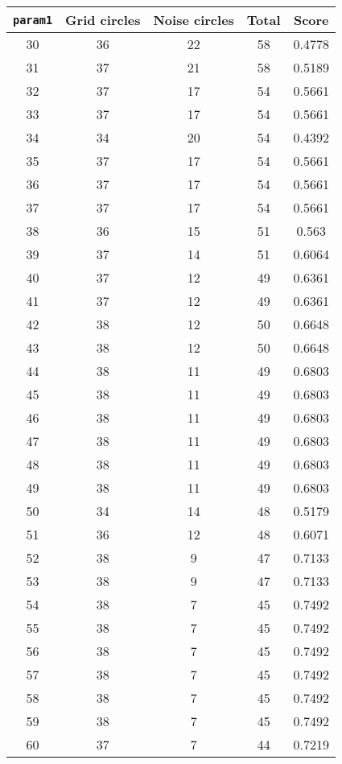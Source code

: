 \documentclass[letterpaper, 12pt]{article}
\begin{document}
\begin{longtable}{|c|c|c|c|c|}
\hline
\textbf{\texttt{param1}} & \textbf{Grid circles} & \textbf{Noise circles} & \textbf{Total} & \textbf{Score} \\
\hline
30 & 36 & 22 & 58 & 0.4778 \\
\hline
31 & 37 & 21 & 58 & 0.5189 \\
\hline
32 & 37 & 17 & 54 & 0.5661 \\
\hline
33 & 37 & 17 & 54 & 0.5661 \\
\hline
34 & 34 & 20 & 54 & 0.4392 \\
\hline
35 & 37 & 17 & 54 & 0.5661 \\
\hline
36 & 37 & 17 & 54 & 0.5661 \\
\hline
37 & 37 & 17 & 54 & 0.5661 \\
\hline
38 & 36 & 15 & 51 & 0.563 \\
\hline
39 & 37 & 14 & 51 & 0.6064 \\
\hline
40 & 37 & 12 & 49 & 0.6361 \\
\hline
41 & 37 & 12 & 49 & 0.6361 \\
\hline
42 & 38 & 12 & 50 & 0.6648 \\
\hline
43 & 38 & 12 & 50 & 0.6648 \\
\hline
44 & 38 & 11 & 49 & 0.6803 \\
\hline
45 & 38 & 11 & 49 & 0.6803 \\
\hline
46 & 38 & 11 & 49 & 0.6803 \\
\hline
47 & 38 & 11 & 49 & 0.6803 \\
\hline
48 & 38 & 11 & 49 & 0.6803 \\
\hline
49 & 38 & 11 & 49 & 0.6803 \\
\hline
50 & 34 & 14 & 48 & 0.5179 \\
\hline
51 & 36 & 12 & 48 & 0.6071 \\
\hline
52 & 38 & 9 & 47 & 0.7133 \\
\hline
53 & 38 & 9 & 47 & 0.7133 \\
\hline
54 & 38 & 7 & 45 & 0.7492 \\
\hline
55 & 38 & 7 & 45 & 0.7492 \\
\hline
56 & 38 & 7 & 45 & 0.7492 \\
\hline
57 & 38 & 7 & 45 & 0.7492 \\
\hline
58 & 38 & 7 & 45 & 0.7492 \\
\hline
59 & 38 & 7 & 45 & 0.7492 \\
\hline
60 & 37 & 7 & 44 & 0.7219 \\

\end{longtable}
\end{document}
